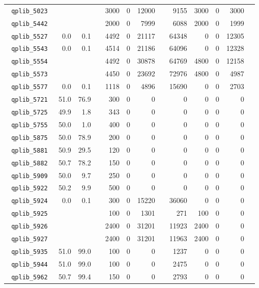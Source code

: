 {\begin{longtable}{lrrrrrrrrrrrr}
\texttt{ 	qplib\_5023	}	&		&		&	&	3000	&	0	&	12000	&	&	9155	&	3000	&	0	&	3000	\\
\texttt{ 	qplib\_5442	}	&		&		&	&	2000	&	0	&	7999	&	&	6088	&	2000	&	0	&	1999	\\
\texttt{ 	qplib\_5527	}	&	0.0	&	0.1	&	&	4492	&	0	&	21117	&	&	64348	&	0	&	0	&	12305	\\
\texttt{ 	qplib\_5543	}	&	0.0	&	0.1	&	&	4514	&	0	&	21186	&	&	64096	&	0	&	0	&	12328	\\
\texttt{ 	qplib\_5554	}	&		&		&	&	4492	&	0	&	30878	&	&	64769	&	4800	&	0	&	12158	\\
\texttt{ 	qplib\_5573	}	&		&		&	&	4450	&	0	&	23692	&	&	72976	&	4800	&	0	&	4987	\\
\texttt{ 	qplib\_5577	}	&	0.0	&	0.1	&	&	1118	&	0	&	4896	&	&	15690	&	0	&	0	&	2703	\\
\texttt{ 	qplib\_5721	}	&	51.0	&	76.9	&	&	300	&	0	&	0	&	&	0	&	0	&	0	&	0	\\
\texttt{ 	qplib\_5725	}	&	49.9	&	1.8	&	&	343	&	0	&	0	&	&	0	&	0	&	0	&	0	\\
\texttt{ 	qplib\_5755	}	&	50.0	&	1.0	&	&	400	&	0	&	0	&	&	0	&	0	&	0	&	0	\\
\texttt{ 	qplib\_5875	}	&	50.0	&	78.9	&	&	200	&	0	&	0	&	&	0	&	0	&	0	&	0	\\
\texttt{ 	qplib\_5881	}	&	50.9	&	29.5	&	&	120	&	0	&	0	&	&	0	&	0	&	0	&	0	\\
\texttt{ 	qplib\_5882	}	&	50.7	&	78.2	&	&	150	&	0	&	0	&	&	0	&	0	&	0	&	0	\\
\texttt{ 	qplib\_5909	}	&	50.0	&	9.7	&	&	250	&	0	&	0	&	&	0	&	0	&	0	&	0	\\
\texttt{ 	qplib\_5922	}	&	50.2	&	9.9	&	&	500	&	0	&	0	&	&	0	&	0	&	0	&	0	\\
\texttt{ 	qplib\_5924	}	&	0.0	&	0.1	&	&	300	&	0	&	15220	&	&	36060	&	0	&	0	&	0	\\
\texttt{ 	qplib\_5925	}	&		&		&	&	100	&	0	&	1301	&	&	271	&	100	&	0	&	0	\\
\texttt{ 	qplib\_5926	}	&		&		&	&	2400	&	0	&	31201	&	&	11923	&	2400	&	0	&	0	\\
\texttt{ 	qplib\_5927	}	&		&		&	&	2400	&	0	&	31201	&	&	11963	&	2400	&	0	&	0	\\
\texttt{ 	qplib\_5935	}	&	51.0	&	99.0	&	&	100	&	0	&	0	&	&	1237	&	0	&	0	&	0	\\
\texttt{ 	qplib\_5944	}	&	51.0	&	99.0	&	&	100	&	0	&	0	&	&	2475	&	0	&	0	&	0	\\
\texttt{ 	qplib\_5962	}	&	50.7	&	99.4	&	&	150	&	0	&	0	&	&	2793	&	0	&	0	&	0	\\

\end{longtable}}
